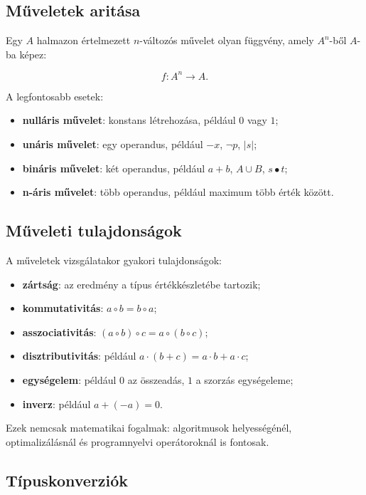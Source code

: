 \subsection{Műveletek aritása}

Egy $A$ halmazon értelmezett $n$-változós művelet olyan függvény, amely $A^n$-ből $A$-ba képez:

\[
f:A^n\to A.
\]

A legfontosabb esetek:

\begin{itemize}
  \item \textbf{nulláris művelet}: konstans létrehozása, például $0$ vagy $1$;
  \item \textbf{unáris művelet}: egy operandus, például $-x$, $\neg p$, $|s|$;
  \item \textbf{bináris művelet}: két operandus, például $a+b$, $A\cup B$, $s\bullet t$;
  \item \textbf{n-áris művelet}: több operandus, például maximum több érték között.
\end{itemize}

\subsection{Műveleti tulajdonságok}

A műveletek vizsgálatakor gyakori tulajdonságok:

\begin{itemize}
  \item \textbf{zártság}: az eredmény a típus értékkészletébe tartozik;
  \item \textbf{kommutativitás}: $a\circ b=b\circ a$;
  \item \textbf{asszociativitás}: $(a\circ b)\circ c=a\circ(b\circ c)$;
  \item \textbf{disztributivitás}: például $a\cdot(b+c)=a\cdot b+a\cdot c$;
  \item \textbf{egységelem}: például $0$ az összeadás, $1$ a szorzás egységeleme;
  \item \textbf{inverz}: például $a+(-a)=0$.
\end{itemize}

Ezek nemcsak matematikai fogalmak: algoritmusok helyességénél, optimalizálásnál és programnyelvi operátoroknál is fontosak.

\subsection{Típuskonverziók}

